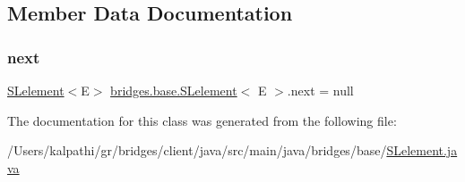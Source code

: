 \subsection{Member Data Documentation}
\mbox{\label{classbridges_1_1base_1_1_s_lelement_abf61c96a74ad319d561c6952ea388e0e}} 
\subsubsection{\texorpdfstring{next}{next}}
{\footnotesize\ttfamily \mbox{\hyperlink{classbridges_1_1base_1_1_s_lelement}{S\+Lelement}}$<$E$>$ \mbox{\hyperlink{classbridges_1_1base_1_1_s_lelement}{bridges.\+base.\+S\+Lelement}}$<$ E $>$.next = null\hspace{0.3cm}{\ttfamily [protected]}}



The documentation for this class was generated from the following file\+:\begin{DoxyCompactItemize}
\item 
/\+Users/kalpathi/gr/bridges/client/java/src/main/java/bridges/base/\mbox{\hyperlink{_s_lelement_8java}{S\+Lelement.\+java}}\end{DoxyCompactItemize}

